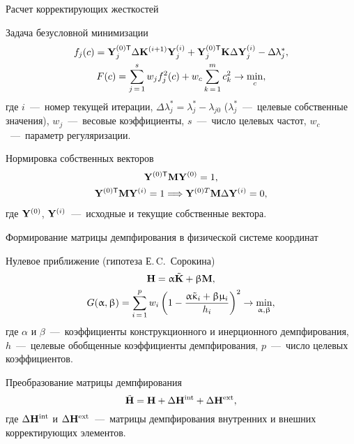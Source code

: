 \begin{frame}{Расчет корректирующих жесткостей}
	\begin{block}{Задача безусловной минимизации}
		\vspace{-1em}
		\begin{gather}
			f_j(c) = \mathbf{Y}_j^{(0)\mathsf{T}} \Delta \mathbf{K}^{(i+1)} \mathbf{Y}_j^{(i)} + \mathbf{Y}_j^{(0)\mathsf{T}} \mathbf{K} \Delta \mathbf{Y}_j^{(i)} - \Delta \uplambda^*_j, \\
			F(c) = \sum \limits_{j\,=\,1}^s w_j f_j^2(c) + w_c \sum \limits_{k\,=\,1}^m c_k^2 \rightarrow \min_{c},
		\end{gather}
		где $ i $~---~номер текущей итерации, $ \Delta \lambda^*_j = \lambda_j^* - \lambda_{j0} $ ($\lambda_j^*$~---~целевые собственные значения), $ w_j $~---~весовые коэффициенты, $ s $~---~число целевых частот, $ w_c $~---~параметр регуляризации.
	\end{block}	
	\begin{block}{Нормировка собственных векторов}
		\vspace{-1em}
		\begin{gather}
			\mathbf{Y}^{(0)\mathsf{T}} \mathbf{M} \mathbf{Y}^{(0)} = 1, \\
			\mathbf{Y}^{(0)\mathsf{T}} \mathbf{M} \mathbf{Y}^{(i)} = 1 \Longrightarrow \mathbf{Y}^{(0)T} \mathbf{M} \Delta \mathbf{Y}^{(i)} = 0,
		\end{gather}
		где $ \mathbf{Y}^{(0)} $, $ \mathbf{Y}^{(i)} $~---~исходные и текущие собственные вектора.
	\end{block}	
\end{frame}

\begin{frame}{Формирование матрицы демпфирования в физической системе координат}
	\begin{block}{Нулевое приближение (гипотеза Е.\,C.~Сорокина)}
		\begin{gather}
			\mathbf{H} = \upalpha \tilde{\mathbf{K}} + \upbeta \mathbf{M}, \\
			G(\upalpha, \upbeta) = \sum\limits_{i\,=\,1}^p w_i \left( 1 - \frac{\upalpha \tilde{\upkappa}_i + \upbeta \upmu_i}{h_i} \right)^2 \rightarrow \min_{\upalpha, \upbeta},
		\end{gather}
		где $ \alpha $ и $ \beta $~---~коэффициенты конструкционного и инерционного демпфирования, $ h $~---~целевые обобщенные коэффициенты демпфирования, $ p $~---~число целевых коэффициентов.
	\end{block}
	\begin{block}{Преобразование матрицы демпфирования} 
 		\begin{equation} 
			\tilde{\mathbf{H}} = \mathbf{H} + \Delta \mathbf{H} ^ {\text{int}} + \Delta \mathbf{H} ^ {\text{ext}},
		\end{equation}
		где $ \Delta \mathbf{H} ^ {\text{int}} $ и $ \Delta \mathbf{H} ^ {\text{ext}} $~---~матрицы демпфирования внутренних и внешних корректирующих элементов. 
	\end{block}
\end{frame}

